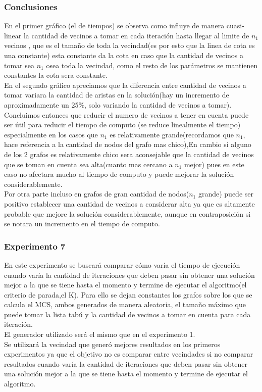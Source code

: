 \subsubsection*{Conclusiones}\;
En el primer gráfico (el de tiempos) se observa como influye de manera cuasi-linear la cantidad de vecinos a tomar en cada iteración hasta llegar al limite de $n_1$ vecinos , que es el tamaño de toda la vecindad(es por esto que la linea de cota es una constante) esta constante da la cota en caso que la cantidad de vecinos a tomar sea $n_1$ osea toda la vecindad, como el resto de los parámetros se mantienen constantes la cota sera constante.\\
En el segundo gráfico apreciamos que la diferencia entre cantidad de vecinos a tomar variara la cantidad de aristas en la solución(hay un incremento de aproximadamente un 25\%, solo variando la cantidad de vecinos a tomar).\\
Concluimos entonces que reducir el numero de vecinos a tener en cuenta puede ser útil para reducir el tiempo de computo (se reduce linealmente el tiempo) especialmente en los casos que $n_1$ es relativamente grande(recordamos que $n_1$, hace referencia a la cantidad de nodos del grafo mas chico),En cambio si alguno de los 2 grafos es relativamente chico sera aconsejable que la cantidad de vecinos que se toman en cuenta sea alta(cuanto mas cercano a $n_1$ mejor) pues en este caso no afectara mucho al tiempo de computo y puede mejorar la solución considerablemente.\\
Por otra parte incluso en grafos de gran cantidad de nodos($n_1$ grande) puede ser positivo establecer una cantidad de vecinos a considerar alta ya que es altamente probable que mejore la solución considerablemente, aunque en contraposición si se notara un incremento en el tiempo de computo.


\subsubsection*{Experimento 7}\;
\noindent En este experimento se buscará comparar cómo varía el tiempo de ejecución cuando varía la cantidad de iteraciones que deben pasar sin obtener una solución mejor a la que se tiene hasta el momento y termine de ejecutar el algoritmo(el criterio de parada,el  K). Para ello se dejan constantes los grafos sobre los que se calcula el MCS, ambos generados de manera aleatoria, el tamaño máximo que puede tomar la lista tabú y la cantidad de vecinos a tomar en cuenta para cada iteración.\\
El generador utilizado será el mismo que en el experimento 1.\\
Se utilizará la vecindad que generó mejores resultados en los primeros experimentos ya que el objetivo no es comparar entre vecindades si no comparar resultados cuando varía la cantidad de iteraciones que deben pasar sin obtener una solución mejor a la que se tiene hasta el momento y termine de ejecutar el algoritmo.

